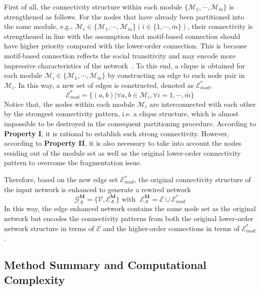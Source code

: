 \documentclass[sigconf]{acmart}
\begin{document}
First of all, the connectivity structure within each module $\{\mathcal{M}_{1},\cdots, \mathcal{M}_{\bar{m}}\}$ is strengthened as follows. For the nodes that have already been partitioned into the same module, e.g., $\mathcal{M}_{i} \in \{\mathcal{M}_{1},\cdots, \mathcal{M}_{\bar{m}}\} (i \in \{1,\cdots, \bar{m}\})$, their connectivity is strengthened in line with the assumption that motif-based connection should have higher priority compared with the lower-order connection. This is because motif-based connection reflects the social transitivity and may encode more impressive characteristics of the network~\cite{wasserman1994social,strogatz2001exploring}. To this end, a clique is obtained for each module $\mathcal{M}_{i}\in\{\mathcal{M}_{1},\cdots, \mathcal{M}_{\bar{m}}\}$ by constructing an edge to each node pair in $\mathcal{M}_{i}$. In this way, a new set of edges is constructed, denoted as $\mathcal{E}^{*}_{mod}$,
\begin{equation}
\label{eq:ModEdgeSet}
\mathcal{E}^{*}_{mod}=\{(a,b)|\forall a,b\in\mathcal{M}_{i}, \forall i=1,\cdots,\bar{m}\}
\end{equation}
Notice that, the nodes within each module $\mathcal{M}_{i}$ are interconnected with each other by the strongest connectivity pattern, i.e. a clique structure, which is almost impossible to be destroyed in the consequent partitioning procedure. According to \textbf{Property I}, it is rational to establish such strong connectivity. However, according to \textbf{Property II}, it is also necessary to take into account the nodes residing out of the module set as well as the original lower-order connectivity pattern to overcome the fragmentation issue.

Therefore, based on the new edge set $\mathcal{E}^{*}_{mod}$, the original connectivity structure of the input network is enhanced to generate a rewired network
\begin{equation}
\label{eq:GMA}
\mathcal{G}_{A}^{\mathbf{M}} = \{\mathcal{V},\mathcal{E}_{A}^{\mathbf{M}}\} \text{ with~~} \mathcal{E}_{A}^{\mathbf{M}} = \mathcal{E} \cup \mathcal{E}^{*}_{mod}
\end{equation}
In this way, the edge enhanced network contains the same node set as the original network but encodes the connectivity patterns from both the original lower-order network structure in terms of $\mathcal{E}$ and the higher-order connections in terms of $\mathcal{E}^{*}_{mod}$.

\subsection{Method Summary and Computational Complexity}
\label{sec:complexity}
\end{document}
